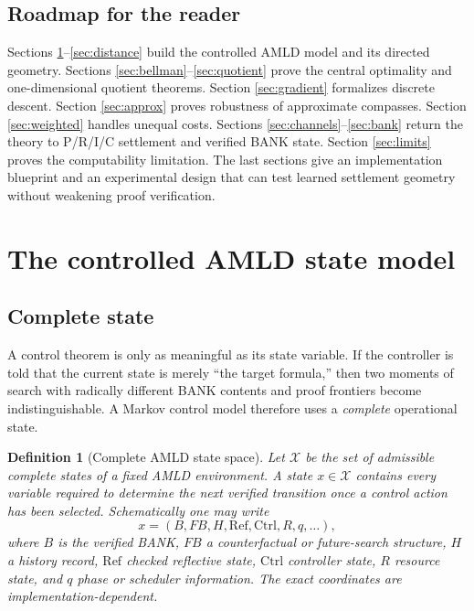 \documentclass[11pt,letterpaper]{article}
\newtheorem{definition}[theorem]{Definition}
\theoremstyle{remark}
\newcommand{\X}{\mathcal X}
\begin{document}
\subsection{Roadmap for the reader}

Sections \ref{sec:model}--\ref{sec:distance} build the controlled AMLD model and its directed geometry. Sections \ref{sec:bellman}--\ref{sec:quotient} prove the central optimality and one-dimensional quotient theorems. Section \ref{sec:gradient} formalizes discrete descent. Section \ref{sec:approx} proves robustness of approximate compasses. Section \ref{sec:weighted} handles unequal costs. Sections \ref{sec:channels}--\ref{sec:bank} return the theory to P/R/I/C settlement and verified BANK state. Section \ref{sec:limits} proves the computability limitation. The last sections give an implementation blueprint and an experimental design that can test learned settlement geometry without weakening proof verification.

\section{The controlled AMLD state model}\label{sec:model}

\subsection{Complete state}

A control theorem is only as meaningful as its state variable. If the controller is told that the current state is merely ``the target formula,'' then two moments of search with radically different BANK contents and proof frontiers become indistinguishable. A Markov control model therefore uses a \emph{complete} operational state.

\begin{definition}[Complete AMLD state space]
Let $\X$ be the set of admissible complete states of a fixed AMLD environment. A state $x\in\X$ contains every variable required to determine the next verified transition once a control action has been selected. Schematically one may write
\[
x=(B,FB,H,\mathrm{Ref},\mathrm{Ctrl},R,q,\ldots),
\]
where $B$ is the verified BANK, $FB$ a counterfactual or future-search structure, $H$ a history record, $\mathrm{Ref}$ checked reflective state, $\mathrm{Ctrl}$ controller state, $R$ resource state, and $q$ phase or scheduler information. The exact coordinates are implementation-dependent.
\end{definition}
\end{document}
